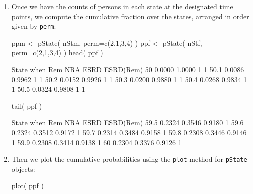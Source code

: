 \begin{enumerate}[resume]

\item Once we have the counts of persons in each state at the
  designated time points, we compute the cumulative fraction over the
  states, arranged in order given by \texttt{perm}:
\begin{Schunk}
\begin{Sinput}
 ppm <- pState( nStm, perm=c(2,1,3,4) )
 ppf <- pState( nStf, perm=c(2,1,3,4) )
 head( ppf )
\end{Sinput}
\begin{Soutput}
      State
when      Rem    NRA ESRD ESRD(Rem)
  50   0.0000 1.0000    1         1
  50.1 0.0086 0.9962    1         1
  50.2 0.0152 0.9926    1         1
  50.3 0.0200 0.9880    1         1
  50.4 0.0268 0.9834    1         1
  50.5 0.0324 0.9808    1         1
\end{Soutput}
\begin{Sinput}
 tail( ppf )
\end{Sinput}
\begin{Soutput}
      State
when      Rem    NRA   ESRD ESRD(Rem)
  59.5 0.2324 0.3546 0.9180         1
  59.6 0.2324 0.3512 0.9172         1
  59.7 0.2314 0.3484 0.9158         1
  59.8 0.2308 0.3446 0.9146         1
  59.9 0.2308 0.3414 0.9138         1
  60   0.2304 0.3376 0.9126         1
\end{Soutput}
\end{Schunk}


\item Then we plot the cumulative probabilities using the \texttt{plot}
  method for \texttt{pState} objects:
\begin{Schunk}
\begin{Sinput}
 plot( ppf )
\end{Sinput}
\end{Schunk}


\end{enumerate}
